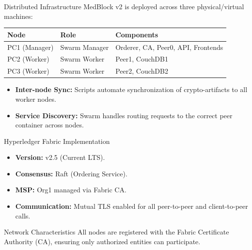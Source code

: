 \documentclass[10pt]{beamer}
\begin{document}
\begin{frame}{Distributed Infrastructure}
    MedBlock v2 is deployed across three physical/virtual machines:
    \begin{table}
        \tiny
        \begin{tabular}{|l|l|l|}
            \hline
            \textbf{Node} & \textbf{Role} & \textbf{Components} \\ \hline
            PC1 (Manager) & Swarm Manager & Orderer, CA, Peer0, API, Frontends \\ \hline
            PC2 (Worker) & Swarm Worker & Peer1, CouchDB1 \\ \hline
            PC3 (Worker) & Swarm Worker & Peer2, CouchDB2 \\ \hline
        \end{tabular}
    \end{table}
    \vfill
    \begin{itemize}
        \item \textbf{Inter-node Sync:} Scripts automate synchronization of crypto-artifacts to all worker nodes.
        \item \textbf{Service Discovery:} Swarm handles routing requests to the correct peer container across nodes.
    \end{itemize}
\end{frame}

\begin{frame}{Hyperledger Fabric Implementation}
    \begin{itemize}
        \item \textbf{Version:} v2.5 (Current LTS).
        \item \textbf{Consensus:} Raft (Ordering Service).
        \item \textbf{MSP:} Org1 managed via Fabric CA.
        \item \textbf{Communication:} Mutual TLS enabled for all peer-to-peer and client-to-peer calls.
    \end{itemize}
    \vfill
    \begin{block}{Network Characteristics}
        All nodes are registered with the Fabric Certificate Authority (CA), ensuring only authorized entities can participate.
    \end{block}
\end{frame}
\end{document}
